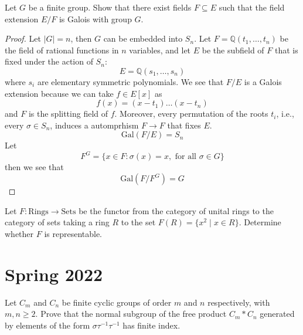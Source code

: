 \documentclass[openany]{book}
\newcommand{\Q}{\mathbb{Q}}
\newcommand{\gal}{\text{Gal}}
\begin{document}
\begin{prob}
    Let \(G\) be a finite group. Show that there exist fields \(F \subseteq E\) such that the field extension \(E/F\) is Galois with group \(G\).
\end{prob}
\begin{proof}
    Let $|G|=n$, then $G$ can be embedded into $S_n$. Let $F=\Q(t_1,\dots,t_n)$ be the field of rational functions in $n$ variables, and let $E$ be the subfield of $F$ that is fixed under the action of $S_n$:
    \begin{equation*}
        E=\Q(s_1,\dots, s_n)
    \end{equation*} 
    where $s_i$ are elementary symmetric polynomials. We see that $F/E$ is a Galois extension because we can take $f\in E[x]$ as 
    \begin{equation*}
        f(x)=(x-t_1)\dots(x-t_n)
    \end{equation*}
    and $F$ is the splitting field of $f$. Moreover, every permutation of the roots $t_i$, i.e., every $\sigma\in S_n$, induces a automprhism $F\to F$ that fixes $E$.
    \begin{equation*}
        \gal(F/E)=S_n
    \end{equation*}
    Let
    \begin{equation*}
        F^G=\{x\in F: \sigma(x)=x, \text{ for all } \sigma\in G\}
    \end{equation*}
    then we see that 
    \begin{equation*}
        \gal(F/F^G)=G
    \end{equation*}
\end{proof}




\begin{prob}
    Let \(F: \text{Rings} \rightarrow \text{Sets}\) be the functor from the category of unital rings to the category of sets taking a ring \(R\) to the set \(F(R) = \{x^2 \mid x \in R\}\). Determine whether \(F\) is representable.
\end{prob}





\chapter{Spring 2022}


\begin{prob}
    Let \(C_m\) and \(C_n\) be finite cyclic groups of order \(m\) and \(n\) respectively, with \(m, n \geq 2\). Prove that the normal subgroup of the free product \(C_m * C_n\) generated by elements of the form \(\sigma \tau^{-1} \tau^{-1}\) has finite index.
\end{prob}
\end{document}

